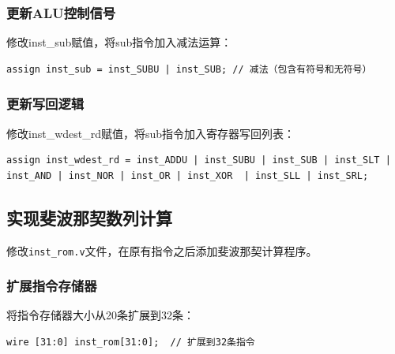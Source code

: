 \documentclass[12pt,a4paper]{article}
\begin{document}
\subsubsection{更新ALU控制信号}
修改inst\_sub赋值，将sub指令加入减法运算：
\begin{lstlisting}
assign inst_sub = inst_SUBU | inst_SUB; // 减法（包含有符号和无符号）
\end{lstlisting}

\subsubsection{更新写回逻辑}
修改inst\_wdest\_rd赋值，将sub指令加入寄存器写回列表：
\begin{lstlisting}
assign inst_wdest_rd = inst_ADDU | inst_SUBU | inst_SUB | inst_SLT | inst_AND | inst_NOR | inst_OR | inst_XOR  | inst_SLL | inst_SRL;                   
\end{lstlisting}

\subsection{实现斐波那契数列计算}
修改\texttt{inst\_rom.v}文件，在原有指令之后添加斐波那契计算程序。

\subsubsection{扩展指令存储器}
将指令存储器大小从20条扩展到32条：
\begin{lstlisting}
wire [31:0] inst_rom[31:0];  // 扩展到32条指令
\end{lstlisting}
\end{document}
